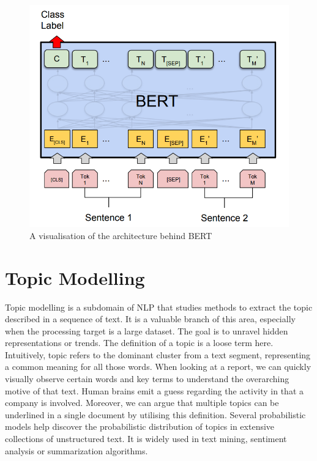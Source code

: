 \documentclass[12pt,MSc,a4paper,oneside]{muthesis}
\begin{document}
\begin{figure}[h]
    \centering
    \includegraphics[scale=0.5]{images/abstract/bert.png}
    \caption{A visualisation of the architecture behind BERT}
\end{figure}

\section{Topic Modelling}
Topic modelling is a subdomain of NLP that studies methods to extract the topic described in a sequence of text. It is a valuable branch of this area, especially when the processing target is a large dataset. The goal is to unravel hidden representations or trends. The definition of a topic is a loose term here. Intuitively, topic refers to the dominant cluster from a text segment, representing a common meaning for all those words. When looking at a report, we can quickly visually observe certain words and key terms to understand the overarching motive of that text. Human brains emit a guess regarding the activity in that a company is involved.
Moreover, we can argue that multiple topics can be underlined in a single document by utilising this definition. Several probabilistic models help discover the probabilistic distribution of topics in extensive collections of unstructured text. It is widely used in text mining, sentiment analysis or summarization algorithms.
\end{document}
